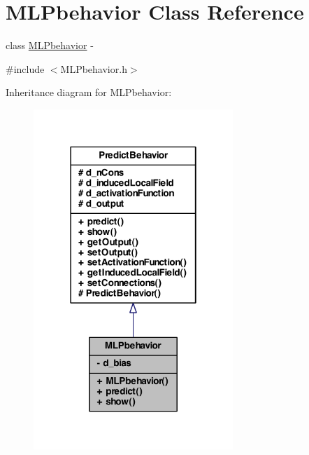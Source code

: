 \hypertarget{class_m_l_pbehavior}{
\section{MLPbehavior Class Reference}
\label{class_m_l_pbehavior}
}


class \hyperlink{class_m_l_pbehavior}{MLPbehavior} -\/  




{\ttfamily \#include $<$MLPbehavior.h$>$}



Inheritance diagram for MLPbehavior:
\nopagebreak
\begin{figure}[H]
\begin{center}
\leavevmode
\includegraphics[width=214pt]{class_m_l_pbehavior__inherit__graph}
\end{center}
\end{figure}



